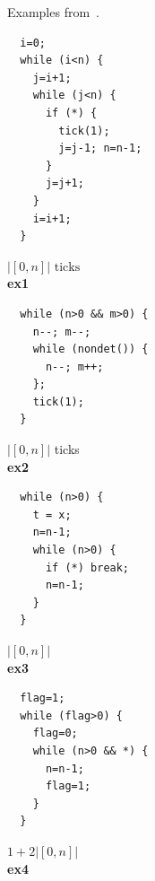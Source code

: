 \documentclass[nocopyrightspace,preprint,pldi]{sigplanconf-pldi15}
\begin{document}
{\begin{figure}
   \caption{Examples from~\cite{GulwaniJK09}.}
  \label{fig:cat2c}
\end{figure}


\begin{figure}
 \setlength{\progwidth}{.24\linewidth}
  \centering
%
%
  \begin{minipage}[b]{\progwidth}
    \begin{center}
   \begin{lstlisting}
  i=0;
  while (i<n) {
    j=i+1;
    while (j<n) {
      if (*) {
        tick(1);
        j=j-1; n=n-1;
      }
      j=j+1;
    }
    i=i+1;
  }
   \end{lstlisting}
$|[0, n]| \text{ ticks}$
\\[.7\baselineskip]
      {\bf ex1}
    \end{center}
  \end{minipage}
%
%
  \begin{minipage}[b]{\progwidth}
    \begin{center}
   \begin{lstlisting}
  while (n>0 && m>0) {
    n--; m--;
    while (nondet()) {
      n--; m++;
    };
    tick(1);
  }
   \end{lstlisting}
$|[0,n]|$ ticks
\\[.7\baselineskip]
      {\bf ex2}
    \end{center}
  \end{minipage}
%
%
  \begin{minipage}[b]{\progwidth}
    \begin{center}
   \begin{lstlisting}
  while (n>0) {
    t = x;
    n=n-1;
    while (n>0) {
      if (*) break;
      n=n-1;
    }
  }
   \end{lstlisting}
$|[0, n]|$
\\[.7\baselineskip]
      {\bf ex3}
    \end{center}
  \end{minipage}
%
%
  \begin{minipage}[b]{\progwidth}
    \begin{center}
   \begin{lstlisting}
  flag=1;
  while (flag>0) {
    flag=0;
    while (n>0 && *) {
      n=n-1;
      flag=1;
    }
  }
   \end{lstlisting}
$1 + 2|[0, n]|$
\\[.7\baselineskip]
      {\bf ex4}
    \end{center}
  \end{minipage}



\end{figure}}
\end{document}
